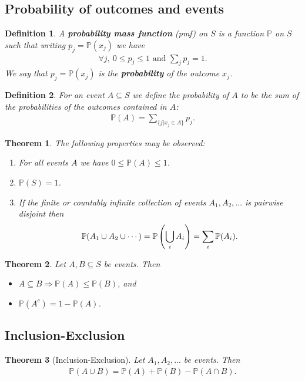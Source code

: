 \documentclass{article}
\theoremstyle{sltheorem}
\newtheorem{definition}{Definition}[section]
\newtheorem{theorem}{Theorem}[section]
\renewcommand{\P}{\mathbb{P}}
\newcommand{\wbigcup}{\mathop{\bigcup}\displaylimits}
\newcommand*\B[1]{\textbf{#1}}
\begin{document}
\subsection{Probability of outcomes and events}
\begin{definition}
    A \B{probability mass function} (pmf) on $S$ is a function $\P$ on $S$ such that writing $p_j=\P(x_j)$ we have
    \begin{align*}
        \forall j,\:0 \leq p_j \leq 1 \text{ and } \sum_j p_j = 1.
    \end{align*}
    We say that $p_j=\P(x_j)$ is the \B{probability} of the outcome $x_j$.
\end{definition}
\begin{definition}
    For an event $A\subseteq S$ we define the probability of $A$ to be the sum of the probabilities of the outcomes contained in 
    $A$: 
    \begin{align*}
        \P(A) = \sum_{\{j | x_j \in A\}} p_j.
    \end{align*}
\end{definition}
\begin{theorem}
    The following properties may be observed:
    \begin{enumerate}
        \item For all events $A$ we have $0\leq \P(A) \leq 1$.
        \item $\P(S)=1$.
        \item If the finite or countably infinite collection of events $A_1, A_2, ...$ is pairwise disjoint then
        \begin{align*}
            \P(A_1 \cup A_2 \cup \cdots) = \P\left(\wbigcup_i A_i\right) = \sum_i \P(A_i).
        \end{align*}
    \end{enumerate}
\end{theorem}
\begin{theorem}
    Let $A,B\subseteq S$ be events. Then 
    \begin{itemize}
        \item $A \subseteq B \Rightarrow \P(A) \leq \P(B)$, and
        \item $\P(A^c) = 1 - \P(A)$.
    \end{itemize}
\end{theorem}
\subsection{Inclusion-Exclusion}
\begin{theorem}[Inclusion-Exclusion]
    Let $A_1, A_2, ...$ be events. Then
    \begin{align*}
        \P(A\cup B)=\P(A) + \P(B) - \P(A\cap B).
    \end{align*}
\end{theorem}
\end{document}
